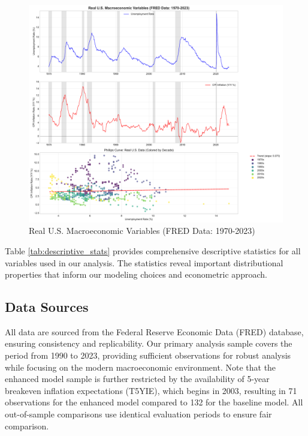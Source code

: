 \documentclass[12pt]{article}
\begin{document}
\begin{figure}[H]
\centering
\includegraphics[width=\textwidth]{figures/time_series_overview.pdf}
\caption{Real U.S. Macroeconomic Variables (FRED Data: 1970-2023)}
\label{fig:time_series}
\end{figure}

Table \ref{tab:descriptive_stats} provides comprehensive descriptive statistics for all variables used in our analysis. The statistics reveal important distributional properties that inform our modeling choices and econometric approach.



\subsection{Data Sources}

All data are sourced from the Federal Reserve Economic Data (FRED) database, ensuring consistency and replicability. Our primary analysis sample covers the period from 1990 to 2023, providing sufficient observations for robust analysis while focusing on the modern macroeconomic environment. Note that the enhanced model sample is further restricted by the availability of 5-year breakeven inflation expectations (T5YIE), which begins in 2003, resulting in 71 observations for the enhanced model compared to 132 for the baseline model. All out-of-sample comparisons use identical evaluation periods to ensure fair comparison.
\end{document}
